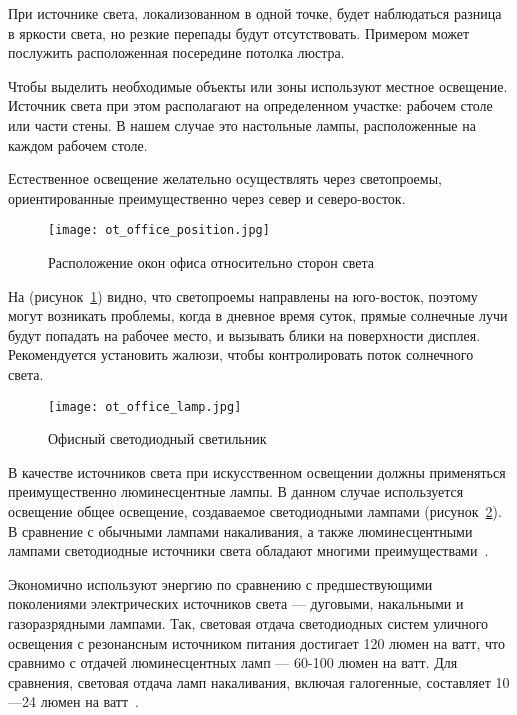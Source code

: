 При источнике света, локализованном в одной точке, будет наблюдаться разница в яркости света, но резкие перепады будут отсутствовать.
Примером может послужить расположенная посередине потолка люстра.

Чтобы выделить необходимые объекты или зоны используют местное освещение.
Источник света при этом располагают на определенном участке: рабочем столе или части стены.
В нашем случае это настольные лампы, расположенные на каждом рабочем столе.

Естественное освещение желательно осуществлять через светопроемы, ориентированные преимущественно через север и северо-восток.

\begin{figure}[ht]
\centering
  \texttt{[image: ot\_office\_position.jpg]}
  \caption{ Расположение окон офиса относительно сторон света }
  \label{fig:office_position}
\end{figure}

На (рисунок~\ref{fig:office_position}) видно, что светопроемы направлены на юго-восток, поэтому могут возникать проблемы, когда в дневное время суток, прямые солнечные лучи будут попадать на рабочее место, и вызывать блики на поверхности дисплея.
Рекомендуется установить жалюзи, чтобы контролировать поток солнечного света.

\begin{figure}[ht]
\centering
  \texttt{[image: ot\_office\_lamp.jpg]}
  \caption{ Офисный светодиодный светильник }
  \label{fig:office_lamp}
\end{figure}

В качестве источников света при искусственном освещении должны применяться преимущественно люминесцентные лампы.
В данном случае используется освещение общее освещение, создаваемое светодиодными лампами (рисунок~\ref{fig:office_lamp}).
В сравнение с обычными лампами накаливания, а также люминесцентными лампами светодиодные источники света обладают многими преимуществами~\cite{ot_diod_lamp}.

Экономично используют энергию по сравнению с предшествующими поколениями электрических источников света --- дуговыми, накальными и газоразрядными лампами.
Так, световая отдача светодиодных систем уличного освещения с резонансным источником питания достигает 120 люмен на ватт, что сравнимо с отдачей люминесцентных ламп --- 60-100 люмен на ватт.
Для сравнения, световая отдача ламп накаливания, включая галогенные, составляет 10—24 люмен на ватт~\cite{ot_diod_lamp}.

